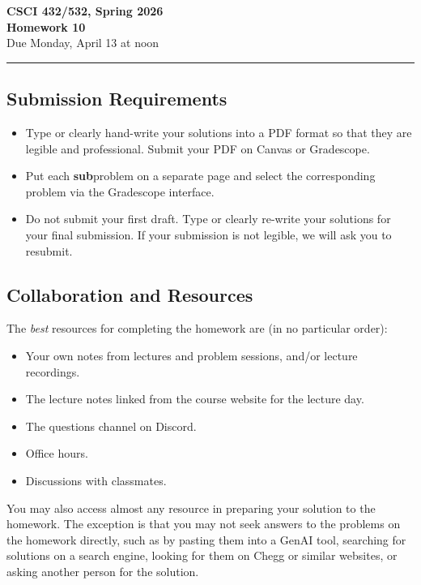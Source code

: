 \documentclass[11pt]{article}
\begin{document}
\begin{center}
\Large\textbf{CSCI 432/532, Spring 2026}%
\\
\LARGE\textbf{Homework 10}%
\\[0.5ex]
\large Due Monday, April 13 at noon
\end{center}

\bigskip
\hrule
\bigskip

\subsection*{Submission Requirements}
\begin{itemize}
    \item Type or clearly hand-write your solutions into a PDF format so that they are legible and professional. Submit your PDF on Canvas or Gradescope. 
	\item Put each \textbf{sub}problem on a separate page and select the corresponding problem via the Gradescope interface.
    \item Do not submit your first draft. Type or clearly re-write your solutions for your final submission. If your submission is not legible, we will ask you to resubmit.
\end{itemize}

\subsection*{Collaboration and Resources}

The \emph{best} resources for completing the homework are (in no particular order):
\begin{itemize}
	\item Your own notes from lectures and problem sessions, and/or lecture recordings.
	\item The lecture notes linked from the course website for the lecture day.
	\item The questions channel on Discord.
	\item Office hours.
	\item Discussions with classmates.
\end{itemize}
You may also access almost any resource in preparing your solution to the
homework. The exception is that you may not seek answers to the problems on the
homework directly, such as by pasting them into a GenAI tool, searching for
solutions on a search engine, looking for them on Chegg or similar websites, or
asking another person for the solution.
\end{document}
